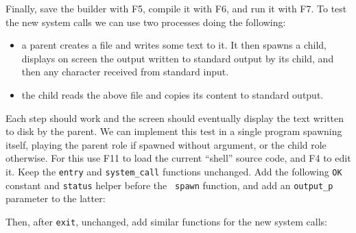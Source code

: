 \noindent Finally, save the builder with F5, compile it with F6, and run it
with F7. To test the new system calls we can use two processes doing the
following:
\begin{itemize}
  \item a parent creates a file and writes some text to it. It then spawns a
  child, displays on screen the output written to standard output by its child,
  and then any character received from standard input.

  \item the child reads the above file and copies its content to standard
  output.
\end{itemize}
Each step should work and the screen should eventually display the text written
to disk by the parent. We can implement this test in a single program spawning
itself, playing the parent role if spawned without argument, or the child role
otherwise. For this use F11 to load the current ``shell'' source code, and F4
to edit it. Keep the {\tt entry} and {\tt system\_call} functions unchanged.
Add the following {\tt OK} constant and {\tt status} helper before the {\tt
spawn} function, and add an {\tt output\_p} parameter to the latter:


Then, after {\tt exit}, unchanged, add similar functions for the new system
calls:


